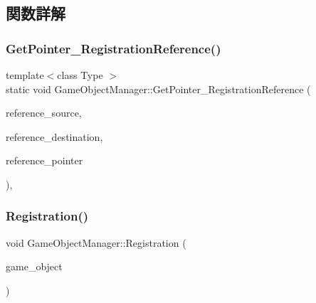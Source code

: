 \subsection{関数詳解}
\mbox{\label{class_game_object_manager_a035c39b0f483e65572c7bc027802aee9}} 
\subsubsection{\texorpdfstring{Get\+Pointer\+\_\+\+Registration\+Reference()}{GetPointer\_RegistrationReference()}}
{\footnotesize\ttfamily template$<$class Type $>$ \\
static void Game\+Object\+Manager\+::\+Get\+Pointer\+\_\+\+Registration\+Reference (\begin{DoxyParamCaption}\item[{\mbox{\hyperlink{class_game_object_origin}{Game\+Object\+Origin}} $\ast$}]{reference\+\_\+source,  }\item[{Type $\ast$}]{reference\+\_\+destination,  }\item[{Type $\ast$}]{reference\+\_\+pointer }\end{DoxyParamCaption})\hspace{0.3cm}{\ttfamily [inline]}, {\ttfamily [static]}}

\mbox{\label{class_game_object_manager_ae8bbcddd70626ae7e8741050abb65977}} 
\subsubsection{\texorpdfstring{Registration()}{Registration()}}
{\footnotesize\ttfamily void Game\+Object\+Manager\+::\+Registration (\begin{DoxyParamCaption}\item[{\mbox{\hyperlink{class_game_object_origin}{Game\+Object\+Origin}} $\ast$}]{game\+\_\+object }\end{DoxyParamCaption})\hspace{0.3cm}{\ttfamily [static]}}

